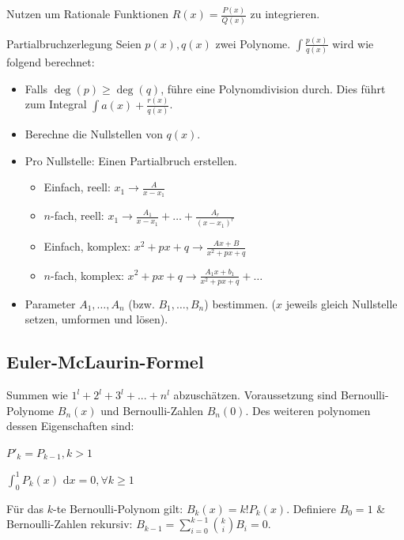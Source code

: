 \documentclass[a4paper]{article}
\def\dx{\text{ d}x}
\begin{document}
Nutzen um Rationale Funktionen $R(x) = \frac{P(x)}{Q(x)}$ zu integrieren.
\begin{mainbox}{Partialbruchzerlegung}
  Seien $p(x), q(x)$ zwei Polynome. $\int \frac{p(x)}{q(x)}$ wird wie folgend berechnet:
  \begin{itemize}[leftmargin=4.5mm, topsep=1pt, parsep=1pt]
    \item[1.] Falls $\deg(p) \ge \deg(q)$, führe eine Polynomdivision durch. Dies führt zum Integral $\int a(x) + \frac{r(x)}{q(x)}$.
    \item[2.] Berechne die Nullstellen von $q(x)$.
    \item[3.] Pro Nullstelle: Einen Partialbruch erstellen.
      \begin{itemize}[leftmargin=4.5mm, topsep=1pt, parsep=1pt]
        \item Einfach, reell: $x_1 \to \frac{A}{x - x_1}$
        \item $n$-fach, reell: $x_1 \to \frac{A_1}{x - x_1} + \ldots + \frac{A_r}{(x-x_1)^r}$
        \item Einfach, komplex: $x^2 + px + q \to \frac{Ax + B} {x^2 + px + q}$
        \item $n$-fach, komplex: $x^2 + px + q \to \frac{A_1x+b_1}{x^2+px+q} + \ldots$
      \end{itemize}
    \item[4.] Parameter $A_1, \ldots, A_n$ (bzw. $B_1, \ldots, B_n$) bestimmen. ($x$ jeweils gleich Nullstelle setzen, umformen und lösen).
  \end{itemize}
\end{mainbox}

\subsection{Euler-McLaurin-Formel}
Summen wie $1^l + 2^l + 3^l + ... + n^l$ abzuschätzen.
Voraussetzung sind Bernoulli-Polynome $B_n(x)$ und Bernoulli-Zahlen $B_n(0)$.
Des weiteren polynomen dessen Eigenschaften sind:

\begin{inparaenum}
  \item $P'_k = P_{k-1}, k > 1$ \qquad 
  \item $\int_0^1 P_k(x)\dx = 0, \forall k \geq 1$
\end{inparaenum}

Für das $k$-te Bernoulli-Polynom gilt: $B_k(x) = k!P_k(x)$.
Definiere $B_0=1$ \& Bernoulli-Zahlen rekursiv: $B_{k-1} = \sum_{i=0}^{k-1}{k \choose i}B_i = 0$.
\end{document}
